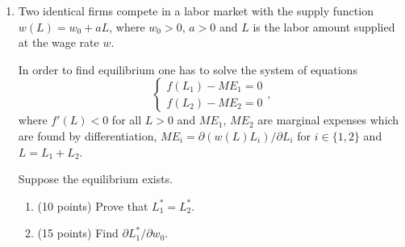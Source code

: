 \documentclass[12pt]{article} %
\theoremstyle{definition} %
\begin{document}
\begin{enumerate}[resume]
\item Two identical firms compete in a labor market with the supply function $w(L)= w_0 + aL$, 
where $w_0>0$, $a>0$ and $L$ is the labor amount supplied at the wage rate $w$.

In order to find equilibrium one has to solve the system of equations
\[
\begin{cases}
  f(L_1) - ME_1 = 0 \\
  f(L_2) - ME_2 = 0
\end{cases},
\]
where $f'(L)<0$ for all $L>0$ 
and $ME_1$, $ME_2$ are marginal expenses which are found by differentiation, 
$ME_i = \partial (w(L)L_i)/\partial L_i$ for $i \in \{1, 2\}$ and $L = L_1 + L_2$. 

Suppose the equilibrium exists.
\begin{enumerate}
  \item (10 points) Prove that $L_1^*=L_2^*$.
  \item (15 points) Find $\partial L_1^*/\partial w_0$.
\end{enumerate}

\end{enumerate}







\newpage
{}
\end{document}
